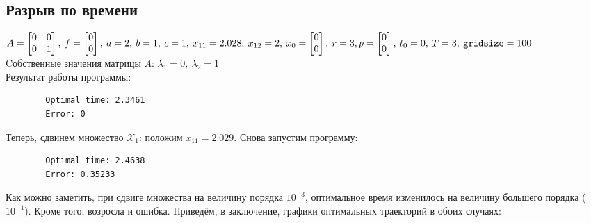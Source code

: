 \documentclass[11pt, oneside, final]{article}
\theoremstyle{break}
\numberwithin{equation}{section}
\theoremstyle{plain}
\theoremstyle{definition}
\begin{document}
    \subsection{Разрыв по времени}
    \(A = \begin{bmatrix} 0 & 0 \\ 0 & 1 \end{bmatrix},\:f = \begin{bmatrix} 0 \\ 0 \end{bmatrix},\: a = 2,\: b = 1,\: c = 1,\: x_{11} = 2.028,\: x_{12} = 2,\: x_0 =  \begin{bmatrix} 0 \\ 0 \end{bmatrix}, \: r = 3, \\ p = \begin{bmatrix} 0 \\ 0 \end{bmatrix}, \: t_0 = 0, \: T = 3, \: \mathtt{gridsize} = 100 \)\\
    Cобственные значения матрицы \(A\): \(\lambda_1 = 0, \: \lambda_2 = 1\)\\
    Результат работы программы: 
    \begin{verbatim}
        Optimal time: 2.3461
        Error: 0
    \end{verbatim}
    Теперь, сдвинем множество \(\mathcal{X}_1\): положим \(x_{11} = 2.029\). Снова запустим программу:
    \begin{verbatim}
        Optimal time: 2.4638
        Error: 0.35233
    \end{verbatim}
    Как можно заметить, при сдвиге множества на величину порядка \(10^{-3}\), оптимальное время изменилось на величину большего порядка (\(10^{-1}\)). Кроме того, возросла и ошибка. Приведём, в заключение, графики оптимальных траекторий в обоих случаях:
\end{document}

